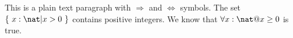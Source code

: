 \documentclass[a4paper,10pt,fleqn]{article}
\begin{document}
\noindent This is a plain text paragraph with $\Rightarrow$ and $\Leftrightarrow$ symbols. The set $\{~ x : \nat | x > 0 ~\}$ contains positive integers. We know that $\forall x : \nat @ x \geq 0$ is true.

\bigskip
\end{document}
